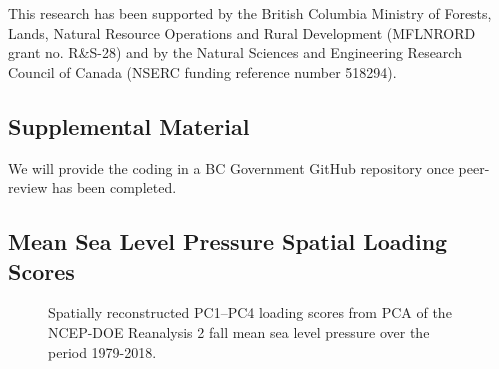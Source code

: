 \documentclass{tATO2e}
\begin{document}
This research has been supported by the British Columbia Ministry of Forests, Lands, Natural Resource Operations and Rural Development (MFLNRORD grant no. R\&S-28) and by the Natural Sciences and Engineering Research Council of Canada (NSERC funding reference number 518294).

\subsection{Supplemental Material}

We will provide the coding in a BC Government GitHub repository once peer-review has been completed. 







\begin{appendices}
\appendix

\section{Mean Sea Level Pressure Spatial Loading Scores}\medskip\label{ApdxA}

\begin{figure}
	\begin{center}
		\hspace{5pt}
		\hspace{5pt}
		
		\hspace{5pt}
		\hspace{5pt}
		\caption{Spatially reconstructed PC1--PC4 loading scores from PCA of the NCEP-DOE Reanalysis 2 fall mean sea level pressure over the period 1979-2018.}
		\label{mslp_1_4}
	\end{center}
\end{figure}

\begin{figure}
	\begin{center}
		\hspace{5pt}
		\hspace{5pt}
		

\end{center}
\end{figure}
\end{appendices}
\end{document}

